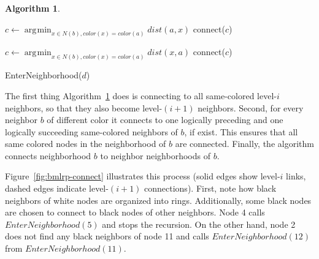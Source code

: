 \documentclass[14pt]{extarticle}
\theoremstyle{definition}
\newtheorem{algo}{Algorithm}
\DeclareMathOperator*{\argmin}{\arg\!\min}
\begin{document}
\begin{algo}
\begin{samepage}
\begin{algorithmic}[1]
                    \State $c \gets \argmin_{x \in N(b), color(x) = color(a)} dist(a,x)$
                        \State connect($c$)     
                    \EndIf

                    \State $c \gets \argmin_{x \in N(b), color(x) = color(a)} dist(x,a)$
                        \State connect($c$)     
                    \EndIf

                        \If {$\argmin_{x \in N(b), color(x) = color(a)} dist(x,a) = a$}
                            \State EnterNeighborhood($d$)   
                        \EndIf
                    \EndFor
                \EndIf
            \EndFor
        \EndFunction
    \end{algorithmic}
    \end{samepage}

    \label{alg:connect}
\end{algo}

The first thing Algorithm~\ref{alg:connect} does is connecting to all same-colored level-$i$ neighbors, so that they also become level-$(i+1)$ neighbors. Second, for every neighbor $b$ of different color it connects to one logically preceding and one logically succeeding same-colored neighbors of $b$, if exist. This ensures that all same colored nodes in the neighborhood of $b$ are connected. Finally, the algorithm connects neighborhood $b$ to neighbor neighborhoods of $b$.

Figure~\ref{fig:bmlrp-connect} illustrates this process (solid edges show level-$i$ links, dashed edges indicate level-$(i+1)$ connections). First, note how black neighbors of white nodes are organized into rings. Additionally, some black nodes are chosen to connect to black nodes of other neighbors. Node 4 calls $EnterNeighborhood(5)$ and stops the recursion. On the other hand, node 2 does not find any black neighbors of node 11 and calls $EnterNeighborhood(12)$ from $EnterNeighborhood(11)$.


\end{document}
